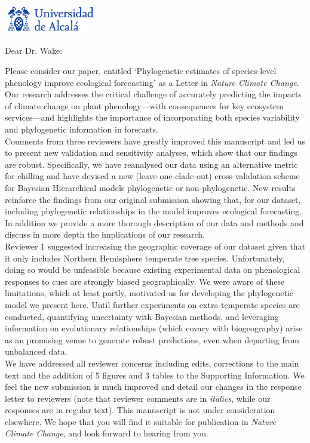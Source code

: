 \documentclass[11pt,a4paper]{letter}
\begin{document}
\begin{letter}{}
\includegraphics[width=0.3\textwidth]{logo_uah.png}

\opening{Dear Dr. Wake:}

\noindent Please consider our paper, entitled `Phylogenetic estimates of species-level phenology improve ecological forecasting' as a Letter in \emph{Nature Climate Change}. Our research addresses the critical challenge of accurately predicting the impacts of climate change on plant phenology---with consequences for key ecosystem services---and highlights the importance of incorporating both species variability and phylogenetic information in forecasts.
\vspace{1.5ex}\\
Comments from three reviewers have greatly improved this manuscript and led us to present new validation and sensitivity analyses, which show that our findings are robust. Specifically, we have reanalysed our data using an alternative metric for chilling and have devised a new (leave-one-clade-out) cross-validation scheme for Bayesian Hierarchical models phylogenetic or non-phylogenetic. New results reinforce the findings from our original submission showing that, for our dataset, including phylogenetic relationships in the model improves ecological forecasting. In addition we provide a more thorough description of our data and methods and discuss in more depth the implications of our research. 
\vspace{1.5ex}\\
Reviewer 1 suggested increasing the geographic coverage of our dataset given that it only includes Northern Hemisphere temperate tree species. Unfortunately, doing so would be unfeasible because existing experimental data on phenological responses to cues are strongly biased geographically. We were aware of these limitations, which at least partly, motivated us for developing the phylogenetic model we present here. Until further experiments on extra-temperate species are conducted, quantifying uncertainty with Bayesian methods, and leveraging information on evolutionary relationships (which covary with biogeography) arise as an promising venue to generate robust predictions, even when departing from unbalanced data.
\vspace{1.5ex}\\
We have addressed all reviewer concerns including edits,  corrections to the main text and the addition of 5 figures and 3 tables to the Supporting Information. We feel the new submission is much improved and detail our changes in the response letter to reviewers (note that reviewer comments are in \emph{italics}, while our responses are in regular text).  This manuscript is not under consideration elsewhere.  We hope that you will find it suitable for publication in \emph{Nature Climate Change}, and look forward to hearing from you.



\end{letter}
\end{document}

